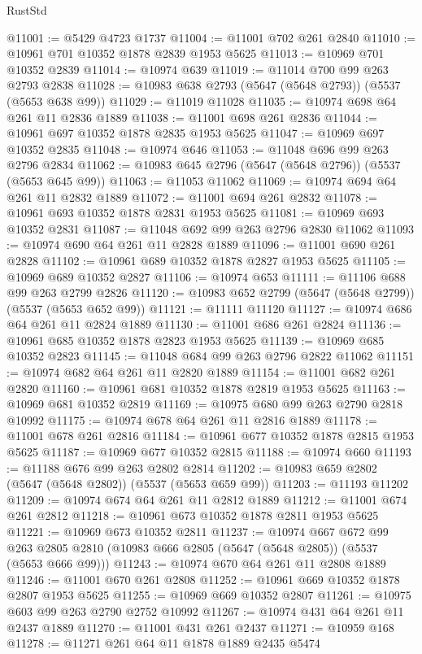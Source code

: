 \begin{lexlean}{RustStd}
\begin{coremodule}
@11001 := @5429 @4723 @1737
@11004 := @11001 @702 @261 @2840
@11010 := @10961 @701 @10352 @1878 @2839 @1953 @5625
@11013 := @10969 @701 @10352 @2839
@11014 := @10974 @639
@11019 := @11014 @700 @99 @263 @2793 @2838
@11028 := @10983 @638 @2793 (@5647 (@5648 @2793)) (@5537 (@5653 @638 @99))
@11029 := @11019 @11028
@11035 := @10974 @698 @64 @261 @11 @2836 @1889
@11038 := @11001 @698 @261 @2836
@11044 := @10961 @697 @10352 @1878 @2835 @1953 @5625
@11047 := @10969 @697 @10352 @2835
@11048 := @10974 @646
@11053 := @11048 @696 @99 @263 @2796 @2834
@11062 := @10983 @645 @2796 (@5647 (@5648 @2796)) (@5537 (@5653 @645 @99))
@11063 := @11053 @11062
@11069 := @10974 @694 @64 @261 @11 @2832 @1889
@11072 := @11001 @694 @261 @2832
@11078 := @10961 @693 @10352 @1878 @2831 @1953 @5625
@11081 := @10969 @693 @10352 @2831
@11087 := @11048 @692 @99 @263 @2796 @2830 @11062
@11093 := @10974 @690 @64 @261 @11 @2828 @1889
@11096 := @11001 @690 @261 @2828
@11102 := @10961 @689 @10352 @1878 @2827 @1953 @5625
@11105 := @10969 @689 @10352 @2827
@11106 := @10974 @653
@11111 := @11106 @688 @99 @263 @2799 @2826
@11120 := @10983 @652 @2799 (@5647 (@5648 @2799)) (@5537 (@5653 @652 @99))
@11121 := @11111 @11120
@11127 := @10974 @686 @64 @261 @11 @2824 @1889
@11130 := @11001 @686 @261 @2824
@11136 := @10961 @685 @10352 @1878 @2823 @1953 @5625
@11139 := @10969 @685 @10352 @2823
@11145 := @11048 @684 @99 @263 @2796 @2822 @11062
@11151 := @10974 @682 @64 @261 @11 @2820 @1889
@11154 := @11001 @682 @261 @2820
@11160 := @10961 @681 @10352 @1878 @2819 @1953 @5625
@11163 := @10969 @681 @10352 @2819
@11169 := @10975 @680 @99 @263 @2790 @2818 @10992
@11175 := @10974 @678 @64 @261 @11 @2816 @1889
@11178 := @11001 @678 @261 @2816
@11184 := @10961 @677 @10352 @1878 @2815 @1953 @5625
@11187 := @10969 @677 @10352 @2815
@11188 := @10974 @660
@11193 := @11188 @676 @99 @263 @2802 @2814
@11202 := @10983 @659 @2802 (@5647 (@5648 @2802)) (@5537 (@5653 @659 @99))
@11203 := @11193 @11202
@11209 := @10974 @674 @64 @261 @11 @2812 @1889
@11212 := @11001 @674 @261 @2812
@11218 := @10961 @673 @10352 @1878 @2811 @1953 @5625
@11221 := @10969 @673 @10352 @2811
@11237 := @10974
    @667
    @672
    @99
    @263
    @2805
    @2810
    (@10983 @666 @2805 (@5647 (@5648 @2805)) (@5537 (@5653 @666 @99)))
@11243 := @10974 @670 @64 @261 @11 @2808 @1889
@11246 := @11001 @670 @261 @2808
@11252 := @10961 @669 @10352 @1878 @2807 @1953 @5625
@11255 := @10969 @669 @10352 @2807
@11261 := @10975 @603 @99 @263 @2790 @2752 @10992
@11267 := @10974 @431 @64 @261 @11 @2437 @1889
@11270 := @11001 @431 @261 @2437
@11271 := @10959 @168
@11278 := @11271 @261 @64 @11 @1878 @1889 @2435 @5474

\end{coremodule}
\end{lexlean}
